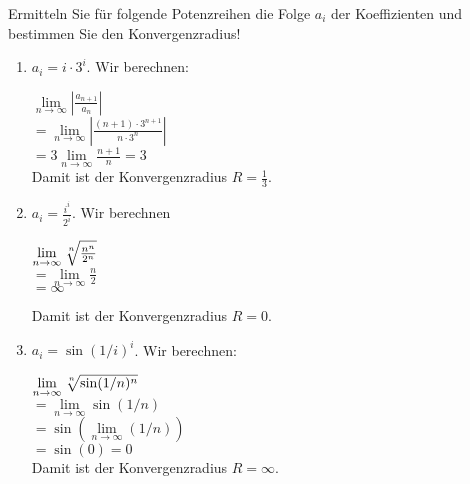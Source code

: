 \item Ermitteln Sie für folgende Potenzreihen die Folge $a_i$ der Koeffizienten und bestimmen Sie den Konvergenzradius!

\begin{enumerate}
\item $a_i =  i\cdot3^i$. Wir berechnen:

$\lim\limits_{n\to\infty} |\frac{a_{n+1}}{a_n}|$ \\
$ = \lim\limits_{n\to\infty} |\frac{(n+1)\cdot 3^{n+1}}{n\cdot 3^n}|$ \\
$ = 3\lim\limits_{n\to\infty}\frac{n+1}{n} = 3$ \\

Damit ist der Konvergenzradius $R=\frac{1}{3}$.

\item $a_i = \frac{i^i}{2^i}$. Wir berechnen

$\lim\limits_{n\to\infty} \nroot{n}{\frac{n^n}{2^n}}$ \\
$ = \lim\limits_{n\to\infty} {\frac{n}{2}}$ \\
$ = \infty$

Damit ist der Konvergenzradius $R=0$.

\item $a_i = \sin(1/i)^i$. Wir berechnen:

$\lim\limits_{n\to\infty} \nroot{n}{\sin(1/n)^n}$ \\
$ = \lim\limits_{n\to\infty} \sin(1/n) $ \\
$ = \sin(\lim\limits_{n\to\infty}(1/n)) $ \\
$ = \sin(0) = 0$ \\

Damit ist der Konvergenzradius $R=\infty$.

\end{enumerate}

